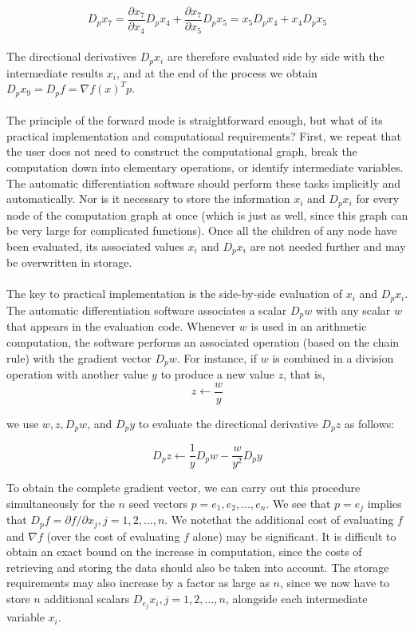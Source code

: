 $$
D_{p} x_{7}=\frac{\partial x_{7}}{\partial x_{4}} D_{p} x_{4}+\frac{\partial x_{7}}{\partial x_{5}} D_{p} x_{5}=x_{5} D_{p} x_{4}+x_{4} D_{p} x_{5}
$$\\
The directional derivatives $D_{p} x_{i}$ are therefore evaluated side by side with the intermediate results $x_{i}$, and at the end of the process we obtain $D_{p} x_{9}=D_{p} f=\nabla f(x)^{T} p$.\\ \\
The principle of the forward mode is straightforward enough, but what of its practical implementation and computational requirements? First, we repeat that the user does not need to construct the computational graph, break the computation down into elementary operations, or identify intermediate variables. The automatic differentiation software should perform these tasks implicitly and automatically. Nor is it necessary to store
the information $x_{i}$ and $D_{p} x_{i}$ for every node of the computation graph at once (which is just as well, since this graph can be very large for complicated functions). Once all the children of any node have been evaluated, its associated values $x_{i}$ and $D_{p} x_{i}$ are not needed further and may be overwritten in storage.\\ \\
The key to practical implementation is the side-by-side evaluation of $x_{i}$ and $D_{p} x_{i}$. The automatic differentiation software associates a scalar $D_{p} w$ with any scalar $w$ that appears in the evaluation code. Whenever $w$ is used in an arithmetic computation, the software performs an associated operation (based on the chain rule) with the gradient vector $D_{p} w$. For instance, if $w$ is combined in a division operation with another value $y$ to produce a new value $z$, that is,
$$
z \leftarrow \frac{w}{y}
$$

we use $w, z, D_{p} w$, and $D_{p} y$ to evaluate the directional derivative $D_{p} z$ as follows:

$$
D_{p} z \leftarrow \frac{1}{y} D_{p} w-\frac{w}{y^{2}} D_{p} y
$$

To obtain the complete gradient vector, we can carry out this procedure simultaneously for the $n$ seed vectors $p=e_{1}, e_{2}, \ldots, e_{n}$. We see that $p=e_{j}$ implies that $D_{p} f=\partial f / \partial x_{j}, j=1,2, \ldots, n$. We notethat the additional cost of evaluating $f$ and $\nabla f$ (over the cost of evaluating $f$ alone) may be significant. It is difficult to obtain an exact bound on the increase in computation, since the costs of retrieving and storing the data should also be taken into account. The storage requirements may also increase by a factor as large as $n$, since we now have to store $n$ additional scalars $D_{e_{j}} x_{i}, j=1,2, \ldots, n$, alongside each intermediate variable $x_{i}$. 

